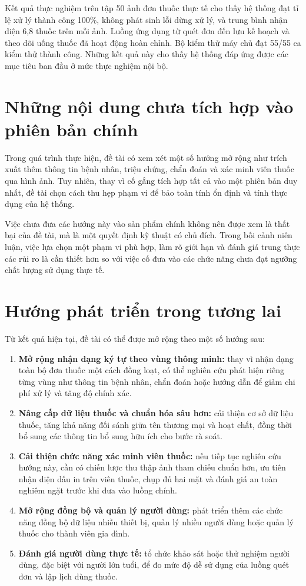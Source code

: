 \documentclass[12pt,a4paper]{report}
\begin{document}
Kết quả thực nghiệm trên tập 50 ảnh đơn thuốc thực tế cho thấy hệ thống đạt tỉ lệ xử lý thành công 100\%, không phát sinh lỗi dừng xử lý, và trung bình nhận diện 6,8 thuốc trên mỗi ảnh. Luồng ứng dụng từ quét đơn đến lưu kế hoạch và theo dõi uống thuốc đã hoạt động hoàn chỉnh. Bộ kiểm thử máy chủ đạt 55/55 ca kiểm thử thành công. Những kết quả này cho thấy hệ thống đáp ứng được các mục tiêu ban đầu ở mức thực nghiệm nội bộ.

\section{Những nội dung chưa tích hợp vào phiên bản chính}

Trong quá trình thực hiện, đề tài có xem xét một số hướng mở rộng như trích xuất thêm thông tin bệnh nhân, triệu chứng, chẩn đoán và xác minh viên thuốc qua hình ảnh. Tuy nhiên, thay vì cố gắng tích hợp tất cả vào một phiên bản duy nhất, đề tài chọn cách thu hẹp phạm vi để bảo toàn tính ổn định và tính thực dụng của hệ thống.

Việc chưa đưa các hướng này vào sản phẩm chính không nên được xem là thất bại của đề tài, mà là một quyết định kỹ thuật có chủ đích. Trong bối cảnh niên luận, việc lựa chọn một phạm vi phù hợp, làm rõ giới hạn và đánh giá trung thực các rủi ro là cần thiết hơn so với việc cố đưa vào các chức năng chưa đạt ngưỡng chất lượng sử dụng thực tế.

\section{Hướng phát triển trong tương lai}

Từ kết quả hiện tại, đề tài có thể được mở rộng theo một số hướng sau:

\begin{enumerate}[label=\arabic*.]
    \item \textbf{Mở rộng nhận dạng ký tự theo vùng thông minh:} thay vì nhận dạng toàn bộ đơn thuốc một cách đồng loạt, có thể nghiên cứu phát hiện riêng từng vùng như thông tin bệnh nhân, chẩn đoán hoặc hướng dẫn để giảm chi phí xử lý và tăng độ chính xác.
    \item \textbf{Nâng cấp dữ liệu thuốc và chuẩn hóa sâu hơn:} cải thiện cơ sở dữ liệu thuốc, tăng khả năng đối sánh giữa tên thương mại và hoạt chất, đồng thời bổ sung các thông tin bổ sung hữu ích cho bước rà soát.
    \item \textbf{Cải thiện chức năng xác minh viên thuốc:} nếu tiếp tục nghiên cứu hướng này, cần có chiến lược thu thập ảnh tham chiếu chuẩn hơn, ưu tiên nhận diện dấu in trên viên thuốc, chụp đủ hai mặt và đánh giá an toàn nghiêm ngặt trước khi đưa vào luồng chính.
    \item \textbf{Mở rộng đồng bộ và quản lý người dùng:} phát triển thêm các chức năng đồng bộ dữ liệu nhiều thiết bị, quản lý nhiều người dùng hoặc quản lý thuốc cho thành viên gia đình.
    \item \textbf{Đánh giá người dùng thực tế:} tổ chức khảo sát hoặc thử nghiệm người dùng, đặc biệt với người lớn tuổi, để đo mức độ dễ sử dụng của luồng quét đơn và lập lịch dùng thuốc.
\end{enumerate}
\end{document}
